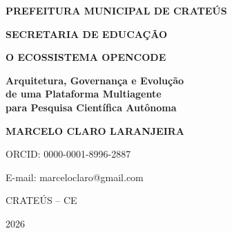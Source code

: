 \begin{titlepage}
  \begin{center}
    \vspace*{1cm}
    {\large\bfseries PREFEITURA MUNICIPAL DE CRATEÚS\par}
    {\large\bfseries SECRETARIA DE EDUCAÇÃO\par}
    \vspace{3cm}

    {\LARGE\bfseries O ECOSSISTEMA OPENCODE\par}
    \vspace{0.5cm}
    {\Large\bfseries Arquitetura, Governança e Evolução\\ de uma Plataforma Multiagente\\ para Pesquisa Científica Autônoma\par}

    \vspace{3cm}
    {\large\bfseries MARCELO CLARO LARANJEIRA\par}
    \vspace{0.3cm}
    {\small ORCID: 0000-0001-8996-2887\par}
    {\small E-mail: marceloclaro@gmail.com\par}
    \vfill
    {\large CRATEÚS -- CE\par}
    {\large 2026\par}
  \end{center}
\end{titlepage}
